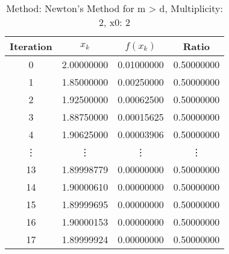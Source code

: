 \begin{table}
\centering
\caption{Method: Newton's Method for m > d, Multiplicity: 2, x0: 2}
\label{tab:table_Newton's_Method_for_m_>_d_2_2}
\begin{tabular}{c c c c}
\toprule
Iteration &      $x_k$ &   $f(x_k)$ &      Ratio \\
\midrule
        0 & 2.00000000 & 0.01000000 & 0.50000000 \\
        1 & 1.85000000 & 0.00250000 & 0.50000000 \\
        2 & 1.92500000 & 0.00062500 & 0.50000000 \\
        3 & 1.88750000 & 0.00015625 & 0.50000000 \\
        4 & 1.90625000 & 0.00003906 & 0.50000000 \\
   \vdots &     \vdots &     \vdots &     \vdots \\
       13 & 1.89998779 & 0.00000000 & 0.50000000 \\
       14 & 1.90000610 & 0.00000000 & 0.50000000 \\
       15 & 1.89999695 & 0.00000000 & 0.50000000 \\
       16 & 1.90000153 & 0.00000000 & 0.50000000 \\
       17 & 1.89999924 & 0.00000000 & 0.50000000 \\
\bottomrule
\end{tabular}
\end{table}
